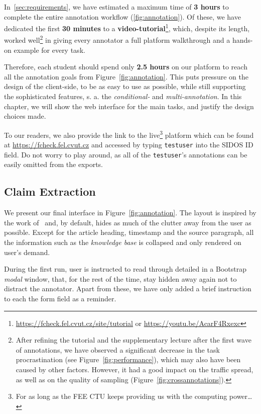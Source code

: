 In~\ref{sec:requirements}, we have estimated a maximum time of \textbf{3 hours} to complete the entire annotation workflow (\ref{fig:annotation}). Of these, we have dedicated the first \textbf{30 minutes} to a \textbf{video-tutorial}\footnote{\url{https://fcheck.fel.cvut.cz/site/tutorial} or \url{https://youtu.be/AcarF4Rxexc}}, which, despite its length, worked well\footnote{
After refining the tutorial and the supplementary lecture after the first wave of annotations, we have observed a significant decrease in the task procrastination (see Figure~\ref{fig:performance}), which may also have been caused by other factors. However, it had a good impact on the traffic spread, as well as on the quality of \tdva{} sampling (Figure~\ref{fig:crossannotations}).} in giving every annotator a full platform walkthrough and a hands-on example for every task.

Therefore, each student should spend only \textbf{2.5 hours} on our platform to reach all the annotation goals from Figure~\ref{fig:annotation}. This puts pressure on the design of the client-side, to be as easy to use as possible, while still supporting the sophisticated features, s. a. the \textit{conditional-} and \textit{multi-annotation}. In this chapter, we will show the web interface for the main tasks, and justify the design choices made.

To our readers, we also provide the link to the live\footnote{For as long as the \textsf{FEE CTU} keeps providing us with the computing power\dots} platform which can be found at \url{https://fcheck.fel.cvut.cz} and accessed by typing  \texttt{testuser} into the \"{\textsf{SIDOS} ID} field. Do not worry to play around, as all of the \texttt{testuser}'s annotations can be easily omitted from the exports.

\subsection{Claim Extraction}
We present our final \tjednaa{} interface in Figure~\ref{fig:annotation}. The layout is inspired by the work of~\cite{fever} and, by default, hides as much of the clutter away from the user as possible. Except for the article heading, timestamp and the source paragraph, all the information such as the \textit{knowledge base} is collapsed and only rendered on user's demand. 

During the first run, user is instructed to read through detailed {} in a \textsf{Bootstrap} \textit{modal} window, that, for the rest of the time, stay hidden away again not to distract the annotator. Apart from these, we have only added a brief instruction to each the form field as a reminder.

